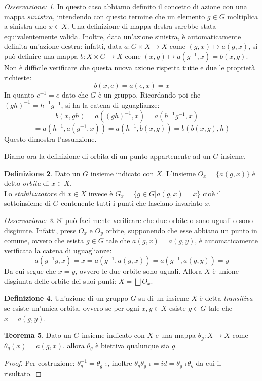 \documentclass[12pt,a4paper]{report}
\theoremstyle{definition}
\newtheorem{Def}{Definizione}[chapter]
\newtheorem{Theo}[Def]{Teorema}
\theoremstyle{definition}
\theoremstyle{definition}
\theoremstyle{remark}
\newtheorem{Obs}[Def]{Osservazione:}
\begin{document}
\begin{Obs}
In questo caso abbiamo definito il concetto di azione con una mappa $\textit{sinistra}$, intendendo con questo termine che un elemento $g\in G$ moltiplica a sinistra uno $x\in X$. Una definizione di mappa destra sarebbe stata equivalentemente valida. Inoltre, data un'azione sinistra, è automaticamente definita un'azione destra: infatti, data $a:G\times X\rightarrow X$ come $(g,x)\longmapsto a(g,x)$, si può definire una mappa $b:X\times G\rightarrow X$ come $(x,g)\longmapsto a(g^{-1},x)=b(x,g)$. Non è difficile verificare che questa nuova azione rispetta tutte e due le proprietà richieste:
$$b(x,e)=a(e,x)=x$$
In quanto $e^{-1}=e$ dato che $G$ è un gruppo. Ricordando poi che $(gh)^{-1}=h^{-1}g^{-1}$, si ha la catena di uguaglianze:
$$b(x,gh)=a((gh)^{-1},x)=a(h^{-1}g^{-1},x)=$$$$=a(h^{-1},a(g^{-1},x))=a(h^{-1},b(x,g))=b(b(x,g),h)$$
Questo dimostra l'assunzione.
\end{Obs}
Diamo ora la definizione di orbita di un punto appartenente ad un $G$ insieme.
\begin{Def}
	Dato un $G$ insieme indicato con $X$. L'insieme $O_x=\{a(g,x)\}$ è detto \textit{orbita} di $x\in X$.\\
	Lo $\textit{stabilizzatore}$ di $x\in X$ invece è $G_x=\{g\in G|a(g,x)=x\}$ cioè il sottoinsieme di $G$ contenente tutti i punti che lasciano invariato $x$.  
\end{Def}
\begin{Obs}
	Si può facilmente verificare che due orbite o sono uguali o sono disgiunte. Infatti, prese $O_x$ e $O_y$ orbite, supponendo che esse abbiano un punto in comune, ovvero che esista $g\in G$ tale che $a(g,x)=a(g,y)$, è automaticamente verificata la catena di uguaglianze:
	$$a(g^{-1}g,x)=x=a(g^{-1},a(g,x))=a(g^{-1},a(g,y))=y$$
	Da cui segue che $x=y$, ovvero le due orbite sono uguali.
	Allora $X$ è unione disgiunta delle orbite dei suoi punti: $X=\bigsqcup O_x$.
\end{Obs}
\begin{Def}
	Un'azione di un gruppo $G$ su di un insieme $X$ è detta \textit{transitiva} se esiste un'unica orbita, ovvero se per ogni $x,y\in X$ esiste $g\in G$ tale che $x=a(g,y)$.
\end{Def}
\begin{Theo}
	Dato un $G$ insieme indicato con $X$ e una mappa $\theta_g:X\rightarrow X$ come $\theta_g(x)=a(g,x)$, allora $\theta_g$ è biettiva qualunque sia $g$.
\end{Theo}
\begin{proof}
	Per costruzione: $\theta_g^{-1}=\theta_{g^{-1}}$, inoltre $\theta_g\theta_{g^{-1}}=id=\theta_{g^{-1}}\theta_g$ da cui il risultato.
\end{proof}
\end{document}
